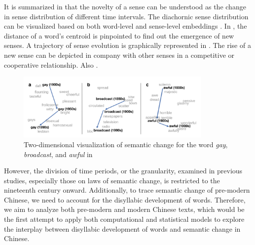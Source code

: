It is summarized in \textcite{tang2018state} that the novelty of a sense can be understood as the change in sense distribution of different time intervals. The diachornic sense distribution can be visualized based on both word-level and sense-level embeddings \parencite{dubossarsky2015bottom,hu2019diachronic}. In \textcite{dubossarsky2015bottom}, the distance of a word's centroid is pinpointed to find out the emergence of new senses. A trajectory of sense evolution is graphically represented in \textcite{hu2019diachronic}. The rise of a new sense can be depicted in company with other senses in a competitive or cooperative relationship. Also \parencite{gonen2020simple}.

\begin{figure}[H]
  \centering
  \includegraphics[width=0.85\textwidth,keepaspectratio]{figures_ref/Hamilton_et_al_2016_two_dimension_viz_of_semantic_change.png}
  \caption{Two-dimensional visualization of semantic change for the word \textit{gay}, \textit{broadcast}, and \textit{awful} in \textcite{hamilton2016law}}
\end{figure}

However, the division of time periods, or the granularity, examined in previous studies, especially those on laws of semantic change, is restricted to the nineteenth century onward. Additionally, to trace semantic change of pre-modern Chinese, we need to account for the disyllabic development of words. Therefore, we aim to analyze both pre-modern and modern Chinese texts, which would be the first attempt to apply both computational and statistical
models to explore the interplay between disyllabic development of words and semantic change in Chinese.



